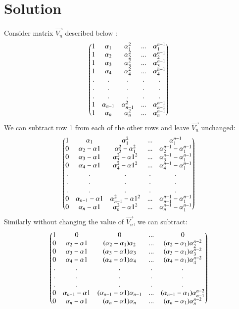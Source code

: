 \documentclass[journal,12pt,twocolumn]{IEEEtran}
\begin{document}
\section{\textbf{Solution}}
Consider matrix $\vec{V_n}$ described below :
\begin{align}
    \begin{pmatrix}1 & \alpha_1 & \alpha_1^2 & ... &\alpha_1^{n-1}\\
    1 & \alpha_2 & \alpha_2^2 & ... &\alpha_2^{n-1}\\
    1 & \alpha_3 & \alpha_3^2 & ... &\alpha_3^{n-1}\\
    1 & \alpha_4 & \alpha_4^2 & ... &\alpha_4^{n-1} \\
    . & . & . & . & . \\
    . & . & . & . & . \\
    . & . & . & . & . \\
    1 & \alpha_{n-1} & \alpha_{n-1}^2 & ... &\alpha_{n-1}^{n-1} \\
    1 & \alpha_n & \alpha_n^2 & ... &\alpha_n^{n-1}\end{pmatrix}
\end{align}
We can subtract row 1 from each of the other rows and leave $\vec{V_n}$ unchanged:
\begin{align}
    \begin{pmatrix}1 & \alpha_1 & \alpha_1^2 & ... &\alpha_1^{n-1}\\
    0 & \alpha_2-\alpha1 & \alpha_2^2-\alpha_1^2 & ... &\alpha_2^{n-1}-\alpha_1^{n-1}\\
    0 & \alpha_3-\alpha1 & \alpha_3^2-\alpha1^2 & ... &\alpha_3^{n-1}-\alpha_1^{n-1}\\
    0 & \alpha_4-\alpha1& \alpha_4^2-\alpha1^2 & ... &\alpha_4^{n-1}-\alpha_1^{n-1} \\
    . & . & . & . & . \\
    . & . & . & . & . \\
    . & . & . & . & . \\
    0 & \alpha_{n-1}-\alpha1& \alpha_{n-1}^2-\alpha1^2 & ... &\alpha_{n-1}^{n-1}-\alpha_1^{n-1} \\
    0 & \alpha_n-\alpha1& \alpha_n^2-\alpha1^2 & ... &\alpha_n^{n-1}-\alpha_1^{n-1}
    \end{pmatrix}
\end{align}
Similarly without changing the value of $\vec{V_n}$, we can subtract:
\begin{align}
    \begin{pmatrix}1 & 0 & 0 & ... & 0 \\
    0 & \alpha_2-\alpha1 & (\alpha_2-\alpha_1)\alpha_2 & ... &(\alpha_2-\alpha_1)\alpha_2^{n-2}\\
    0 & \alpha_3-\alpha1 & (\alpha_3-\alpha1)\alpha_3 & ... &(\alpha_3-\alpha_1)\alpha_3^{n-2}\\
    0 & \alpha_4-\alpha1& (\alpha_4-\alpha1)\alpha_4 & ... &(\alpha_4-\alpha_1)\alpha_4^{n-2} \\
    . & . & . & . & . \\
    . & . & . & . & . \\
    . & . & . & . & . \\
    0 & \alpha_{n-1}-\alpha1& (\alpha_{n-1}-\alpha1)\alpha_{n-1} & ... &(\alpha_{n-1}-\alpha_1)\alpha_{n-1}^{n-2}\\
    0 & \alpha_n-\alpha1& (\alpha_n-\alpha1)\alpha_n & ... &(\alpha_n-\alpha_1)\alpha_n^{n-2} 
    \end{pmatrix}
\end{align}
\end{document}
